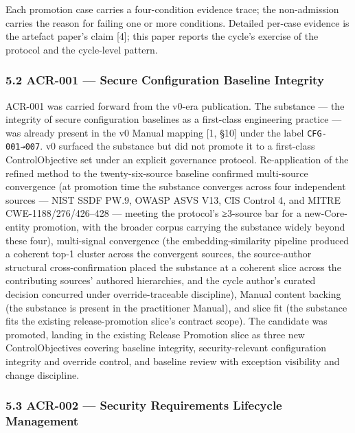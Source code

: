 \documentclass[
]{article}
\begin{document}
Each promotion case carries a four-condition evidence trace; the
non-admission carries the reason for failing one or more conditions.
Detailed per-case evidence is the artefact paper's claim {[}4{]}; this
paper reports the cycle's exercise of the protocol and the cycle-level
pattern.

\subsubsection{5.2 ACR-001 --- Secure Configuration Baseline
Integrity}\label{acr-001-secure-configuration-baseline-integrity}

ACR-001 was carried forward from the v0-era publication. The substance
--- the integrity of secure configuration baselines as a first-class
engineering practice --- was already present in the v0 Manual mapping
{[}1, §10{]} under the label \texttt{CFG-001→007}. v0 surfaced the
substance but did not promote it to a first-class ControlObjective set
under an explicit governance protocol. Re-application of the refined
method to the twenty-six-source baseline confirmed multi-source
convergence (at promotion time the substance converges across four
independent sources --- NIST SSDF PW.9, OWASP ASVS V13, CIS Control 4,
and MITRE CWE-1188/276/426--428 --- meeting the protocol's ≥3-source bar
for a new-Core-entity promotion, with the broader corpus carrying the
substance widely beyond these four), multi-signal convergence (the
embedding-similarity pipeline produced a coherent top-1 cluster across
the convergent sources, the source-author structural cross-confirmation
placed the substance at a coherent slice across the contributing
sources' authored hierarchies, and the cycle author's curated decision
concurred under override-traceable discipline), Manual content backing
(the substance is present in the practitioner Manual), and slice fit
(the substance fits the existing release-promotion slice's contract
scope). The candidate was promoted, landing in the existing Release
Promotion slice as three new ControlObjectives covering baseline
integrity, security-relevant configuration integrity and override
control, and baseline review with exception visibility and change
discipline.

\subsubsection{5.3 ACR-002 --- Security Requirements Lifecycle
Management}\label{acr-002-security-requirements-lifecycle-management}
\end{document}
